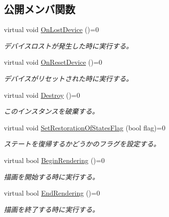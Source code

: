\subsection*{公開メンバ関数}
\begin{DoxyCompactItemize}
\item 
virtual void \mbox{\hyperlink{class_effekseer_renderer_1_1_renderer_a5cf709d5b02e229f94efeec1e08951c4}{On\+Lost\+Device}} ()=0
\begin{DoxyCompactList}\small\item\em デバイスロストが発生した時に実行する。 \end{DoxyCompactList}\item 
virtual void \mbox{\hyperlink{class_effekseer_renderer_1_1_renderer_a2a4e579c8c8b6e368e37a854cbf4c0ec}{On\+Reset\+Device}} ()=0
\begin{DoxyCompactList}\small\item\em デバイスがリセットされた時に実行する。 \end{DoxyCompactList}\item 
virtual void \mbox{\hyperlink{class_effekseer_renderer_1_1_renderer_a8da94391eb26a2bd04830e4d7fcd0bd0}{Destroy}} ()=0
\begin{DoxyCompactList}\small\item\em このインスタンスを破棄する。 \end{DoxyCompactList}\item 
virtual void \mbox{\hyperlink{class_effekseer_renderer_1_1_renderer_ac6de8a0c0d65c03d3242ccfc9946c91c}{Set\+Restoration\+Of\+States\+Flag}} (bool flag)=0
\begin{DoxyCompactList}\small\item\em ステートを復帰するかどうかのフラグを設定する。 \end{DoxyCompactList}\item 
virtual bool \mbox{\hyperlink{class_effekseer_renderer_1_1_renderer_a79aa204f1344347d8e111432d6d5bf5f}{Begin\+Rendering}} ()=0
\begin{DoxyCompactList}\small\item\em 描画を開始する時に実行する。 \end{DoxyCompactList}\item 
virtual bool \mbox{\hyperlink{class_effekseer_renderer_1_1_renderer_aaa6df6f62aead71652bdeb596d0a7ef4}{End\+Rendering}} ()=0
\begin{DoxyCompactList}\small\item\em 描画を終了する時に実行する。 \end{DoxyCompactList}\item 

\end{DoxyCompactItemize}
